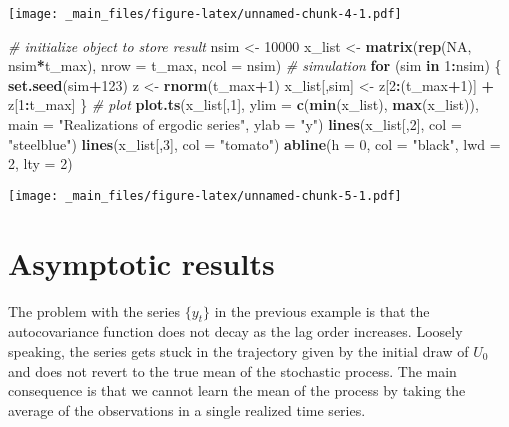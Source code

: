 \documentclass[
]{book}
\newenvironment{Shaded}{\begin{snugshade}}{\end{snugshade}}
\newcommand{\AttributeTok}[1]{\textcolor[rgb]{0.13,0.29,0.53}{#1}}
\newcommand{\CommentTok}[1]{\textcolor[rgb]{0.56,0.35,0.01}{\textit{#1}}}
\newcommand{\ConstantTok}[1]{\textcolor[rgb]{0.56,0.35,0.01}{#1}}
\newcommand{\ControlFlowTok}[1]{\textcolor[rgb]{0.13,0.29,0.53}{\textbf{#1}}}
\newcommand{\DecValTok}[1]{\textcolor[rgb]{0.00,0.00,0.81}{#1}}
\newcommand{\FunctionTok}[1]{\textcolor[rgb]{0.13,0.29,0.53}{\textbf{#1}}}
\newcommand{\NormalTok}[1]{#1}
\newcommand{\OtherTok}[1]{\textcolor[rgb]{0.56,0.35,0.01}{#1}}
\newcommand{\SpecialCharTok}[1]{\textcolor[rgb]{0.81,0.36,0.00}{\textbf{#1}}}
\newcommand{\StringTok}[1]{\textcolor[rgb]{0.31,0.60,0.02}{#1}}
\begin{document}
\texttt{[image: \_main\_files/figure-latex/unnamed-chunk-4-1.pdf]}

\begin{Shaded}
\begin{Highlighting}[]
\CommentTok{\# initialize object to store result}
\NormalTok{nsim }\OtherTok{\textless{}{-}} \DecValTok{10000}
\NormalTok{x\_list }\OtherTok{\textless{}{-}} \FunctionTok{matrix}\NormalTok{(}\FunctionTok{rep}\NormalTok{(}\ConstantTok{NA}\NormalTok{, nsim}\SpecialCharTok{*}\NormalTok{t\_max), }\AttributeTok{nrow =}\NormalTok{ t\_max, }\AttributeTok{ncol =}\NormalTok{ nsim)}
\CommentTok{\# simulation}
\ControlFlowTok{for}\NormalTok{ (sim }\ControlFlowTok{in} \DecValTok{1}\SpecialCharTok{:}\NormalTok{nsim) \{}
  \FunctionTok{set.seed}\NormalTok{(sim}\SpecialCharTok{+}\DecValTok{123}\NormalTok{)}
\NormalTok{  z  }\OtherTok{\textless{}{-}} \FunctionTok{rnorm}\NormalTok{(t\_max}\SpecialCharTok{+}\DecValTok{1}\NormalTok{)}
\NormalTok{  x\_list[,sim] }\OtherTok{\textless{}{-}}\NormalTok{ z[}\DecValTok{2}\SpecialCharTok{:}\NormalTok{(t\_max}\SpecialCharTok{+}\DecValTok{1}\NormalTok{)] }\SpecialCharTok{+}\NormalTok{ z[}\DecValTok{1}\SpecialCharTok{:}\NormalTok{t\_max]}
\NormalTok{\}}
\CommentTok{\# plot}
\FunctionTok{plot.ts}\NormalTok{(x\_list[,}\DecValTok{1}\NormalTok{], }\AttributeTok{ylim =} \FunctionTok{c}\NormalTok{(}\FunctionTok{min}\NormalTok{(x\_list), }\FunctionTok{max}\NormalTok{(x\_list)), }\AttributeTok{main =} \StringTok{"Realizations of ergodic series"}\NormalTok{, }\AttributeTok{ylab =} \StringTok{"y"}\NormalTok{)}
\FunctionTok{lines}\NormalTok{(x\_list[,}\DecValTok{2}\NormalTok{], }\AttributeTok{col =} \StringTok{"steelblue"}\NormalTok{)}
\FunctionTok{lines}\NormalTok{(x\_list[,}\DecValTok{3}\NormalTok{], }\AttributeTok{col =} \StringTok{"tomato"}\NormalTok{)}
\FunctionTok{abline}\NormalTok{(}\AttributeTok{h =} \DecValTok{0}\NormalTok{, }\AttributeTok{col =} \StringTok{"black"}\NormalTok{, }\AttributeTok{lwd =} \DecValTok{2}\NormalTok{, }\AttributeTok{lty =} \DecValTok{2}\NormalTok{)}
\end{Highlighting}
\end{Shaded}

\texttt{[image: \_main\_files/figure-latex/unnamed-chunk-5-1.pdf]}

\hypertarget{asymptotic-results}{%
\section{Asymptotic results}\label{asymptotic-results}}

The problem with the series \(\{y_t\}\) in the previous example is that the autocovariance function does not decay as the lag order increases. Loosely speaking, the series gets stuck in the trajectory given by the initial draw of \(U_0\) and does not revert to the true mean of the stochastic process. The main consequence is that we cannot learn the mean of the process by taking the average of the observations in a single realized time series.
\end{document}
